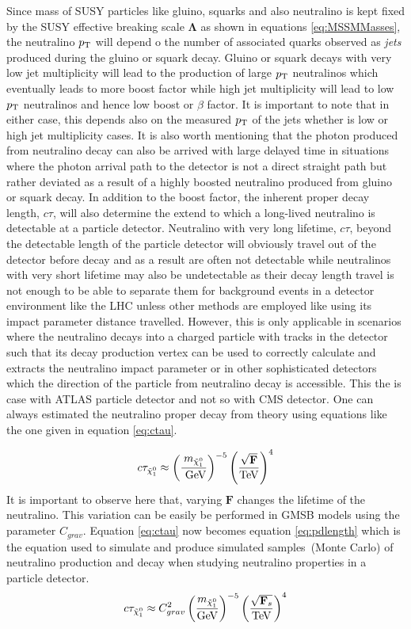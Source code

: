 {Since mass of SUSY particles like gluino, squarks and also neutralino is kept fixed by the SUSY effective breaking scale $\mathbf{\Lambda}$ as shown in equations \ref{eq:MSSMMasses}, the neutralino $p_{\mathrm{T}}$ will depend o the number of associated quarks observed as \textit{jets} produced during the gluino or squark decay. Gluino or squark decays with very low jet multiplicity will lead to the production of large $p_{\mathrm{T}}$ neutralinos which eventually leads to more boost factor while high jet multiplicity will lead to low $p_{\mathrm{T}}$ neutralinos and hence low boost or $\beta$ factor. It is important to note that in either case, this depends also on the measured $p_{\mathrm{T}}$ of the jets whether is low or high jet multiplicity cases. It is also worth mentioning that the photon produced from neutralino decay can also be arrived with large delayed time in situations where the photon arrival path to the detector is not a direct straight path but rather deviated as a result of a highly boosted neutralino produced from gluino or squark decay.
\newline
In addition to the boost factor, the inherent proper decay length, $c\tau$,  will also determine the extend to which a long-lived neutralino is detectable at a particle detector. Neutralino with very long lifetime, $c\tau$, beyond the detectable length of the particle detector will obviously travel out of the detector before decay and as a result are often not detectable while neutralinos with very short lifetime may also be undetectable  as their decay length travel is not enough to be able to separate them for background events in a detector environment like the LHC unless other methods are employed like using its impact parameter distance travelled. However, this is only applicable in scenarios where the neutralino decays into a charged particle with tracks in the detector such that its decay production vertex can be used to correctly calculate and extracts the neutralino impact parameter or in other sophisticated detectors which the direction of the particle from neutralino decay is accessible. This the is case with ATLAS particle detector and not so with CMS detector.
One can always estimated the neutralino proper decay from theory using equations like the one given in equation \ref{eq:ctau}. 

\begin{equation}{\label{eq:ctau}}
c\tau_{\tilde{\chi}^{0}_{1}} \approx \left(\frac{m_{\tilde{\chi}^{0}_{1}}}{\mbox{ GeV}}\right)^{-5}\left(\frac{\sqrt{\mathbf{F}}}{\mbox{TeV}}\right)^{4}
\end{equation}
It is important to observe here that, varying $\mathbf{F}$ changes the lifetime of the neutralino. This variation can be easily be performed in GMSB models using the parameter $C_{grav}$. Equation \ref{eq:ctau} now becomes equation \ref{eq:pdlength}  which is the equation used to simulate and produce simulated samples~(Monte Carlo) of neutralino production and decay when studying neutralino properties in a particle detector. 
\begin{equation}{\label{eq:pdlength}}
c\tau_{\tilde{\chi}^{0}_{1}} \approx C^{2}_{grav} \left(\frac{m_{\tilde{\chi}^{0}_{1}}}{\mbox{GeV}}\right)^{-5}\left(\frac{\sqrt{\mathbf{F}_{s}}}{\mbox{TeV}}\right)^{4}
\end{equation}

}
